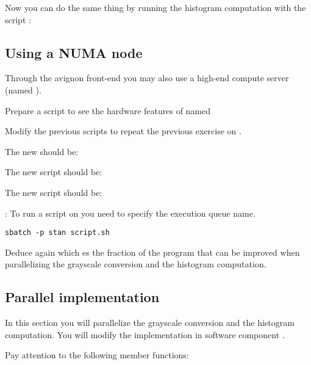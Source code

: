 Now you can do the same thing by running the histogram computation with the
script :



\subsection{Using a NUMA node}

Through the avignon front-end you may also use a high-end compute server (named
).

Prepare a script to see the hardware features of  named



Modify the previous scripts to repeat the previous exercise on .

The new  should be:



The new script  should be:



The new script  should be:



: To run a script on  you need to specify the
execution queue name.

\begin{lstlisting}[style=terminal]
sbatch -p stan script.sh
\end{lstlisting}

Deduce again which es the fraction of the program that can be improved when
parallelizing the grayscale conversion and the histogram computation.

\subsection{Parallel implementation}

In this section you will parallelize the grayscale conversion and the histogram
computation. You will modify the implementation in software component
.

Pay attention to the following member functions:


